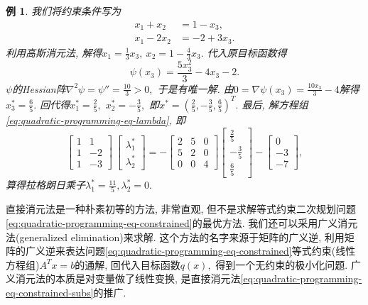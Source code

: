 \documentclass{SBCbookchapter}
\newtheorem{eg}[thm]{例}
\numberwithin{equation}{section}
\begin{document}
\begin{eg}
我们将约束条件写为
\begin{equation*}
\begin{aligned}
x_1 + x_2 & = 1 - x_3, \\
x_1 - 2x_2 & = -2 + 3x_3.
\end{aligned}
\end{equation*}
利用高斯消元法, 解得$x_1 = \frac{1}{3} x_3, ~ x_2 = 1 - \frac{4}{3} x_3.$ 代入原目标函数得
\begin{equation*}
\psi(x_3) = \frac{5 x_{3}^{2}}{3} - 4 x_{3} - 2.
\end{equation*}
$\psi$的Hessian阵$\nabla^2 \psi = \psi'' = \frac{10}{3} > 0,$ 于是有唯一解. 由$0 = \nabla \psi (x_3) = \frac{10 x_{3}}{3} - 4$解得$x_3^* = \frac{6}{5}.$ 回代得$x_1^* = \frac{2}{5},$ $x_2^* = -\frac{3}{5},$ 即$x^* = \left( \frac{2}{5}, -\frac{3}{5}, \frac{6}{5} \right)^T.$ 最后, 解方程组\eqref{eq:quadratic-programming-eq-lambda}, 即
\begin{equation*}
\begin{bmatrix} 1 & 1 \\ 1 & -2 \\ 1 & -3 \end{bmatrix} ~ \begin{bmatrix} \lambda_1^* \\ \lambda_2^* \end{bmatrix} = - \begin{bmatrix} 2 & 5 & 0 \\ 5 & 2 & 0 \\ 0 & 0 & 4 \end{bmatrix} \begin{bmatrix} \frac{2}{5} \\ -\frac{3}{5} \\ \frac{6}{5} \end{bmatrix} - \begin{bmatrix} 0 \\ -3 \\ -7 \end{bmatrix},
\end{equation*}
算得拉格朗日乘子$\lambda_1^* = \frac{11}{5}, \lambda_2^* = 0.$
\end{eg}

直接消元法是一种朴素初等的方法, 非常直观, 但不是求解等式约束二次规划问题\eqref{eq:quadratic-programming-eq-constrained}的最优方法. 我们还可以采用广义消元法(generalized elimination)来求解. 这个方法的名字来源于矩阵的广义逆, 利用矩阵的广义逆来表达问题\eqref{eq:quadratic-programming-eq-constrained}等式约束(线性方程组)$A^T x = b$的通解, 回代入目标函数$q(x),$ 得到一个无约束的极小化问题. 广义消元法的本质是对变量做了线性变换, 是直接消元法\eqref{eq:quadratic-programming-eq-constrained-subs}的推广.
\end{document}

